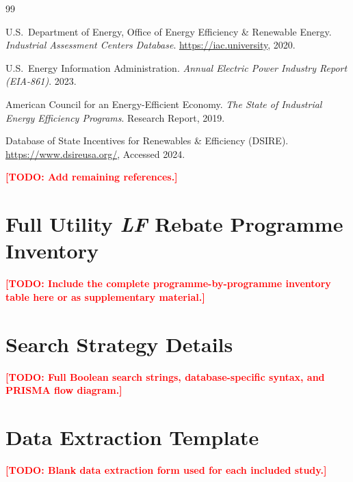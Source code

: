 \documentclass[12pt, a4paper, twocolumn]{article}
\newcommand{\LF}{\textit{LF}}
\newcommand{\TODO}[1]{\textcolor{red}{\textbf{[TODO: #1]}}}
\begin{document}
% 

\begin{thebibliography}{99}

U.S.\ Department of Energy, Office of Energy Efficiency \& Renewable Energy.
\textit{Industrial Assessment Centers Database}.
\url{https://iac.university}, 2020.

U.S.\ Energy Information Administration.
\textit{Annual Electric Power Industry Report (EIA-861)}.
2023.

American Council for an Energy-Efficient Economy.
\textit{The State of Industrial Energy Efficiency Programs}.
Research Report, 2019.

Database of State Incentives for Renewables \& Efficiency (DSIRE).
\url{https://www.dsireusa.org/}, Accessed 2024.

\TODO{Add remaining references.}

\end{thebibliography}


\appendix

\section{Full Utility \LF{} Rebate Programme Inventory}
\label{app:inventory}
\TODO{Include the complete programme-by-programme inventory table here or as supplementary material.}

\section{Search Strategy Details}
\label{app:search}
\TODO{Full Boolean search strings, database-specific syntax, and PRISMA flow diagram.}

\section{Data Extraction Template}
\label{app:extraction}
\TODO{Blank data extraction form used for each included study.}

\end{document}
